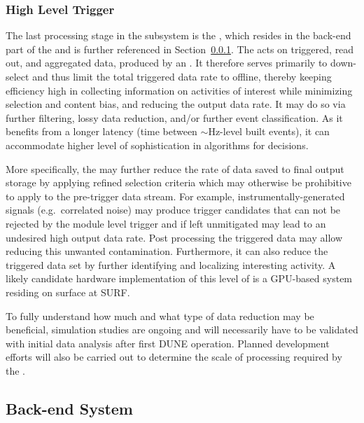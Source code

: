 \subsubsection{High Level Trigger}
\label{sec:fd-daq:design-data-reduction}

The last processing stage in the  subsystem is the
, which resides in the back-end part of the  and
is further referenced in Section~\ref{sec:fd-daq:design-data-reduction}.
The  acts on triggered, read out, and aggregated data,
produced by an . 
It therefore serves primarily to down-select and thus
limit the total triggered data rate to offline, thereby keeping %
efficiency high in collecting information on activities of interest
while minimizing selection and content bias, and reducing the output data
rate. It may do so via 
further filtering, lossy data reduction, and/or further event
classification. As it benefits from a longer latency (time between
$\sim$Hz-level built events), it can accommodate higher level of
sophistication in algorithms for  decisions.

More specifically, the  may further reduce the rate of data saved to final output storage by
applying refined selection criteria which may otherwise be prohibitive
to apply to the pre-trigger data stream.  For example, instrumentally-generated signals (e.g.~correlated noise)
may produce trigger candidates that can not be rejected by the module
level trigger and if left unmitigated may lead to an undesired high
output data rate. 
Post processing the triggered data may allow reducing this unwanted
contamination.
Furthermore, it can also reduce the triggered data set by further identifying
and localizing interesting activity. A likely candidate hardware
implementation of this level of  is a GPU-based system
residing on surface at SURF.

To fully understand how much and what type of data reduction may be
beneficial, simulation studies are ongoing  and will
necessarily have to be
validated with initial data analysis after
first DUNE  operation. Planned 
development efforts will also be carried out to determine the scale of
processing required by the .

\subsection{Back-end System}
\label{sec:fd-daq:design-backend}

